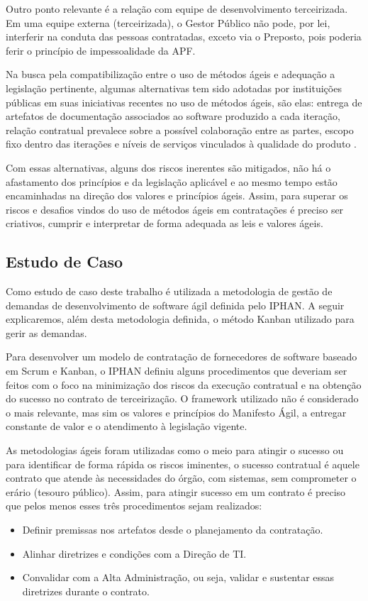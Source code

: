 Outro ponto relevante é a relação com equipe de desenvolvimento terceirizada. Em uma equipe externa (terceirizada), o Gestor Público não pode, por lei, interferir na conduta das pessoas contratadas, exceto via  o Preposto, pois poderia ferir o princípio de impessoalidade da APF.

Na busca pela compatibilização entre o uso de métodos ágeis e adequação a legislação pertinente, algumas alternativas tem sido adotadas por instituições públicas  em suas iniciativas recentes no uso de métodos ágeis, são elas: entrega de artefatos de documentação associados ao software produzido a cada iteração, relação contratual prevalece sobre a possível colaboração entre as partes, escopo fixo dentro das iterações e níveis de serviços vinculados à qualidade do produto   \cite{ruas}. 

Com essas alternativas, alguns dos riscos inerentes são mitigados, não há o afastamento dos princípios e da legislação aplicável e ao mesmo tempo estão encaminhadas na direção dos valores e princípios ágeis. Assim, para superar os riscos e desafios vindos do uso de métodos ágeis em contratações é preciso ser criativos, cumprir e interpretar de forma adequada as leis e valores ágeis. 

\subsection[Estudo de Caso]{Estudo de Caso}

Como estudo de caso deste trabalho é utilizada a metodologia de gestão de demandas de desenvolvimento de software ágil definida pelo IPHAN. A seguir explicaremos, além desta metodologia definida, o método Kanban utilizado para gerir as demandas.

Para desenvolver um modelo de contratação de fornecedores de software baseado em Scrum e Kanban, o IPHAN definiu alguns procedimentos que deveriam ser feitos com o foco na minimização dos riscos da execução contratual e na obtenção do sucesso no contrato de terceirização. O framework utilizado não é considerado o mais relevante, mas sim os valores e princípios do Manifesto Ágil, a entregar constante de valor e o atendimento à legislação vigente. 

As metodologias ágeis foram utilizadas como o meio para atingir o sucesso ou para identificar de forma rápida os riscos iminentes, o sucesso contratual é aquele contrato que atende às necessidades do órgão, com sistemas, sem comprometer o erário (tesouro público). Assim, para atingir sucesso em um contrato é preciso que pelos menos esses três procedimentos sejam realizados:
\begin{itemize}
\item Definir premissas nos artefatos desde o planejamento da contratação.
\item Alinhar diretrizes e condições com a Direção de TI.
\item Convalidar com a Alta Administração, ou seja, validar e sustentar essas diretrizes durante o contrato.
\end{itemize}

